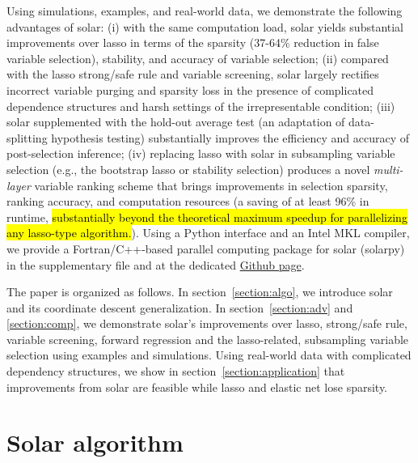 \documentclass[12pt]{article}
\begin{document}
Using simulations, examples, and real-world data, we demonstrate the following advantages of solar: (i) with the same computation load, solar yields substantial improvements over lasso in terms of the sparsity (37-64\% reduction in false variable selection), stability, and accuracy of variable selection; (ii) compared with the lasso strong/safe rule and variable screening, solar largely rectifies incorrect variable purging and sparsity loss in the presence of complicated dependence structures and harsh settings of the irrepresentable condition; (iii) solar supplemented with the hold-out average test (an adaptation of data-splitting hypothesis testing) substantially improves the efficiency and accuracy of post-selection inference; (iv) replacing lasso with solar in subsampling variable selection (e.g., the bootstrap lasso or stability selection) produces a novel \emph{multi-layer} variable ranking scheme that brings improvements in selection sparsity, ranking accuracy, and computation resources (a saving of at least 96\% in runtime, \hl{substantially beyond the theoretical maximum speedup for parallelizing any lasso-type algorithm.}). Using a Python interface and an Intel MKL compiler, we provide a Fortran/C++-based parallel computing package for solar (solarpy) in the supplementary file and at the dedicated \href{https://github.com/isaac2math/solarpy}{Github page}.

The paper is organized as follows. In section~\ref{section:algo}, we introduce solar and its coordinate descent generalization. In section~\ref{section:adv} and \ref{section:comp}, we demonstrate solar's improvements over lasso, strong/safe rule, variable screening, forward regression and the lasso-related, subsampling variable selection using examples and simulations. Using real-world data with complicated dependency structures, we show in section~\ref{section:application} that improvements from solar are feasible while lasso and elastic net lose sparsity.


\section{Solar algorithm \label{section:algo}}
\end{document}

